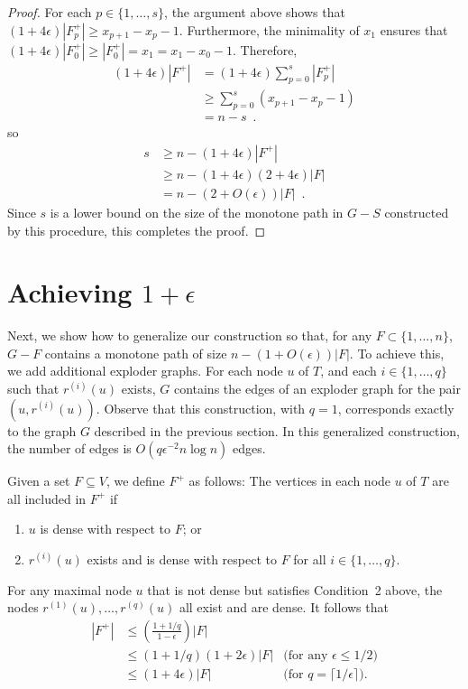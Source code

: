 \documentclass{patmorin}
\begin{document}
\begin{proof}
 For each $p\in\{1,\ldots,s\}$, the argument above shows that $(1+4\epsilon)|F_p^+|\ge x_{p+1}-x_p-1$.
  Furthermore, the minimality of $x_1$ ensures that $(1+4\epsilon)|F_0^+|\ge |F_0^+|=x_1=x_1-x_0-1$.  
   Therefore,
  \begin{align*}
    (1+4\epsilon)|F^+| & = (1+4\epsilon)\sum_{p=0}^s |F^+_p| \\
    & \ge \sum_{p=0}^s (x_{p+1}-x_p-1) \\
    & = n-s \enspace .
  \end{align*}
  so 
  \begin{align*}
    s & \ge n-(1+4\epsilon)|F^+| \\
    & \ge n-(1+4\epsilon)(2+4\epsilon)|F|\\
    & =n-(2+O(\epsilon))|F| \enspace . 
  \end{align*}
  Since $s$ is a lower bound on the size of the monotone path in $G-S$
  constructed by this procedure, this completes the proof.
\end{proof}


\section{Achieving $1+\epsilon$}


Next, we show how to generalize our construction so that, for any
$F\subset\{1,\ldots,n\}$, $G-F$ contains a monotone path of size
$n-(1+O(\epsilon))|F|$. To achieve this, we add additional exploder
graphs.  For each node $u$ of $T$, and each $i\in\{1,\ldots,q\}$ such
that $r^{(i)}(u)$ exists, $G$ contains the edges of an exploder graph for
the pair $(u,r^{(i)}(u))$.  Observe that this construction, with $q=1$,
corresponds exactly to the graph $G$ described in the previous section.
In this generalized construction, the number of edges is $O(q\epsilon^{-2}
n\log n)$ edges.

Given a set $F\subseteq V$, we define $F^+$ as follows: The vertices in
each node $u$ of $T$ are all included in $F^+$ if
\begin{enumerate}
   \item $u$ is dense with respect to $F$; or
   \item $r^{(i)}(u)$ exists and is dense with respect to 
   $F$ for all $i\in\{1,\ldots,q\}$.
\end{enumerate}
For any maximal node $u$ that is not dense but satisfies Condition~2
above, the nodes $r^{(1)}(u),\ldots,r^{(q)}(u)$ all exist and are dense.
It follows that
\begin{align*} 
  |F^+| & \le \left(\frac{1+1/q}{1-\epsilon}\right)|F| \\
  & \le (1+1/q)(1+2\epsilon)|F| &\text{(for any $\epsilon \le 1/2$)} \\
  & \le (1+4\epsilon)|F| &\text{(for $q=\lceil 1/\epsilon\rceil$).}
\end{align*}
\end{document}
